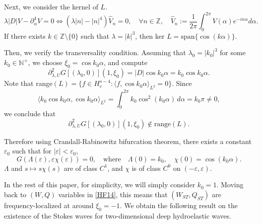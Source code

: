 \documentclass[12pt]{amsart}
\theoremstyle{remark}
\theoremstyle{definition}
\numberwithin{equation}{section}
\newcommand{\p}{\partial}
\newcommand{\N}{\mathbb{N}}
\newcommand{\al}{\alpha}
\newcommand{\f}{\frac}
\newcommand{\la}{\lambda}
\begin{document}
Next, we consider the kernel of $L$.
\begin{equation*}
  \lambda |D|V - \p_\al^4 V = 0 \Leftrightarrow  (\la |n|-|n|^4)\hat{V}_n =0, \quad\forall n\in\mathbb{Z},\quad\hat{V}_n:=\f{1}{2\pi}\int_0^{2\pi}V(\al) e^{-in\al}d\al.
\end{equation*}
If there exists $k\in \mathbb{Z}\setminus\{0\}$ such that $\la= |k|^3$, then ker $ L=\text{span}\{\cos(k\al)\}$.

Then, we verify the transversality condition.
Assuming that $\lambda_0 = |k_0|^3$ for some $k_0 \in \N^+$, we choose $\xi_0 = \cos k_0\al$, and compute
\begin{equation*}
\p_{\lambda, U}^2 G[(\lambda_0, 0)](1, \xi_0) = |D|\cos k_0 \al = k_0 \cos k_0 \al.
\end{equation*}
Note that range$(L) = \{f\in H^{s-4}_e : \langle f, \cos k_0\al \rangle_{L^2} = 0 \}$.
Since 
\begin{equation*}
 \langle k_0 \cos k_0 \al, \cos k_0\al \rangle_{L^2} = \int_0^{2\pi} k_0 \cos^2 (k_0\al) \, d\al = k_0 \pi \neq 0,    
\end{equation*}
we conclude that 
\begin{equation*}
  \p_{\lambda, U}^2 G[(\lambda_0, 0)](1, \xi_0) \notin \text{range}(L).  
\end{equation*}

Therefore using Crandall-Rabinowitz bifurcation theorem, there exists a constant $\varepsilon_0$ such that for $|\varepsilon|<\varepsilon_0$, 
\begin{equation*}
    G(\Lambda(\varepsilon), \varepsilon\chi(\varepsilon)) = 0, \quad \text{where}\quad \Lambda(0) = k_0, \quad \chi(0) = \cos (k_0\al).
\end{equation*}
$\Lambda$ and $s \mapsto s\chi(s)$ are of class $C^1$, and $\chi$ is of class $C^0$ on $(-\varepsilon, \varepsilon)$.

In the rest of this paper, for simplicity, we will simply  consider $k_0 = 1$.
Moving back to $(W, Q)$ variables in \eqref{HF14}, this means that $(W_{ST}, Q_{ST})$ are frequency-localized at around $\xi_0 = -1$.
We obtain the following result on the existence of the Stokes waves for two-dimensional deep hydroelastic waves.
\end{document}
